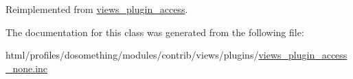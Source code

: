 Reimplemented from \hyperlink{classviews__plugin__access_ade500a95e599deffa417f8cbdd67bbf4}{views\_\-plugin\_\-access}.

The documentation for this class was generated from the following file:\begin{DoxyCompactItemize}
\item 
html/profiles/dosomething/modules/contrib/views/plugins/\hyperlink{views__plugin__access__none_8inc}{views\_\-plugin\_\-access\_\-none.inc}\end{DoxyCompactItemize}
